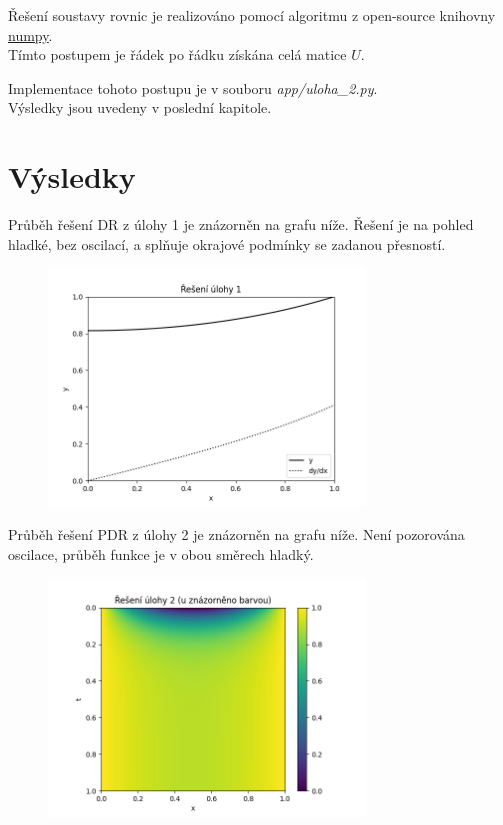 \documentclass[a4paper,12pt]{article}
\begin{document}
Řešení soustavy rovnic je realizováno pomocí algoritmu z open-source knihovny \textcolor{blue}{\underline{\href{https://numpy.org/}{numpy}}}.\\
Tímto postupem je řádek po řádku získána celá matice $U$.

Implementace tohoto postupu je v souboru \textit{app/uloha\_2.py}. \\
Výsledky jsou uvedeny v poslední kapitole.



\newpage
\section*{Výsledky}
Průběh řešení DR z úlohy 1 je znázorněn na grafu níže.
Řešení je na pohled hladké, bez oscilací, a splňuje okrajové podmínky se zadanou přesností.
\begin{figure}[H]
\begin{center}
	\includegraphics[width=0.75\textwidth]{uloha_1.png}
\end{center}
\end{figure}

Průběh řešení PDR z úlohy 2 je znázorněn na grafu níže.
Není pozorována oscilace, průběh funkce je v obou směrech hladký.
\begin{figure}[H]
\begin{center}
	\includegraphics[width=0.75\textwidth]{uloha_2.png}
\end{center}
\end{figure}
\end{document}
